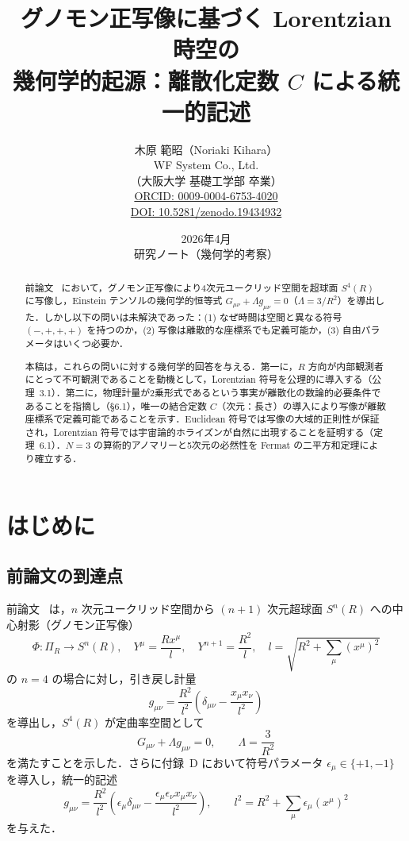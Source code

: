 \documentclass[12pt,a4paper]{ltjsarticle}
\title{\textbf{グノモン正写像に基づく Lorentzian 時空の\\幾何学的起源：離散化定数 $C$ による統一的記述}}
\author{木原 範昭（Noriaki Kihara）\\
\small WF System Co., Ltd.\\
\small （大阪大学 基礎工学部 卒業）\\
\small \href{https://orcid.org/0009-0004-6753-4020}{ORCID: 0009-0004-6753-4020}\\
\small \href{https://doi.org/10.5281/zenodo.19434932}{DOI: 10.5281/zenodo.19434932}}
\date{2026年4月\\[5pt]\small 研究ノート（幾何学的考察）}
\begin{document}
\maketitle

\begin{abstract}
前論文~\cite{Paper1} において，グノモン正写像により4次元ユークリッド空間を超球面 $S^4(R)$ に写像し，Einstein テンソルの幾何学的恒等式 $G_{\mu\nu} + \Lambda g_{\mu\nu} = 0$（$\Lambda = 3/R^2$）を導出した．しかし以下の問いは未解決であった：(1) なぜ時間は空間と異なる符号 $(-,+,+,+)$ を持つのか，(2) 写像は離散的な座標系でも定義可能か，(3) 自由パラメータはいくつ必要か．

本稿は，これらの問いに対する幾何学的回答を与える．第一に，$R$ 方向が内部観測者にとって不可観測であることを動機として，Lorentzian 符号を公理的に導入する（公理~3.1）．第二に，物理計量が2乗形式であるという事実が離散化の数論的必要条件であることを指摘し（\S6.1），唯一の結合定数 $C$（次元：長さ）の導入により写像が離散座標系で定義可能であることを示す．Euclidean 符号では写像の大域的正則性が保証され，Lorentzian 符号では宇宙論的ホライズンが自然に出現することを証明する（定理~6.1）．$N = 3$ の算術的アノマリーと5次元の必然性を Fermat の二平方和定理により確立する．
\end{abstract}

\tableofcontents

\section{はじめに}

\subsection{前論文の到達点}

前論文~\cite{Paper1} は，$n$ 次元ユークリッド空間から $(n+1)$ 次元超球面 $S^n(R)$ への中心射影（グノモン正写像）
\begin{equation}
\Phi: \Pi_R \to S^n(R), \quad Y^\mu = \frac{Rx^\mu}{l}, \quad Y^{n+1} = \frac{R^2}{l}, \quad l = \sqrt{R^2 + \sum_\mu (x^\mu)^2} \tag{1.1}
\end{equation}
の $n = 4$ の場合に対し，引き戻し計量
\begin{equation}
g_{\mu\nu} = \frac{R^2}{l^2}\left(\delta_{\mu\nu} - \frac{x_\mu x_\nu}{l^2}\right) \tag{1.2}
\end{equation}
を導出し，$S^4(R)$ が定曲率空間として
\begin{equation}
G_{\mu\nu} + \Lambda g_{\mu\nu} = 0, \qquad \Lambda = \frac{3}{R^2} \tag{1.3}
\end{equation}
を満たすことを示した．さらに付録~D において符号パラメータ $\epsilon_\mu \in \{+1, -1\}$ を導入し，統一的記述
\begin{equation}
g_{\mu\nu} = \frac{R^2}{l^2}\left(\epsilon_\mu \delta_{\mu\nu} - \frac{\epsilon_\mu \epsilon_\nu x_\mu x_\nu}{l^2}\right), \qquad l^2 = R^2 + \sum_\mu \epsilon_\mu (x^\mu)^2 \tag{1.4}
\end{equation}
を与えた．
\end{document}
